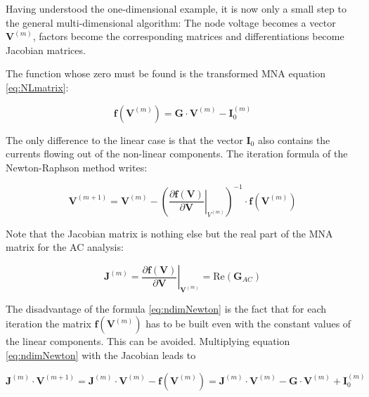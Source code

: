 \addvspace{12pt}

Having understood the one-dimensional example, it is now only a
small step to the general multi-dimensional algorithm: The node
voltage becomes a vector $\boldsymbol{V}^{(m)}$, factors become
the corresponding matrices and differentiations become Jacobian
matrices.

\addvspace{12pt}

The function whose zero must be found is the transformed MNA
equation \ref{eq:NLmatrix}:

\begin{equation}
\boldsymbol{f}( \boldsymbol{V}^{(m)} ) =
    \boldsymbol{G}\cdot \boldsymbol{V}^{(m)} - \boldsymbol{I}_{0}^{(m)}
\end{equation}

The only difference to the linear case is that the vector $\boldsymbol{I}_{0}$
also contains the currents flowing out of the non-linear components.
The iteration formula of the Newton-Raphson method writes:

\begin{equation}
\boldsymbol{V}^{(m+1)} = \boldsymbol{V}^{(m)} -
  \left( \left.\frac{\partial\boldsymbol{f}( \boldsymbol{V} )}
                    {\partial\boldsymbol{V}}\right|_{V^{(m)}} \right)^{-1}
  \cdot \boldsymbol{f}( \boldsymbol{V}^{(m)} )
\label{eq:ndimNewton}
\end{equation}

Note that the Jacobian matrix is nothing else but the real
part of the MNA matrix for the AC analysis:

\begin{equation}
\boldsymbol{J}^{(m)}
  = \left.\frac{\partial\boldsymbol{f}( \boldsymbol{V} )}
               {\partial\boldsymbol{V}}\right|_{\boldsymbol{V}^{(m)}}
  = \text{Re}\left(\boldsymbol{G}_{AC}\right)
\end{equation}

The disadvantage of the formula \ref{eq:ndimNewton} is the fact
that for each iteration the matrix $\boldsymbol{f}( \boldsymbol{V}^{(m)} )$
has to be built even with the constant values of the linear
components. This can be avoided. Multiplying equation
\ref{eq:ndimNewton} with the Jacobian leads to

\begin{equation}
\boldsymbol{J}^{(m)} \cdot \boldsymbol{V}^{(m+1)}
  = \boldsymbol{J}^{(m)} \cdot \boldsymbol{V}^{(m)} -
    \boldsymbol{f}( \boldsymbol{V}^{(m)} )
  = \boldsymbol{J}^{(m)} \cdot \boldsymbol{V}^{(m)} -
    \boldsymbol{G} \cdot \boldsymbol{V}^{(m)} + \boldsymbol{I}_{0}^{(m)}
\end{equation}

